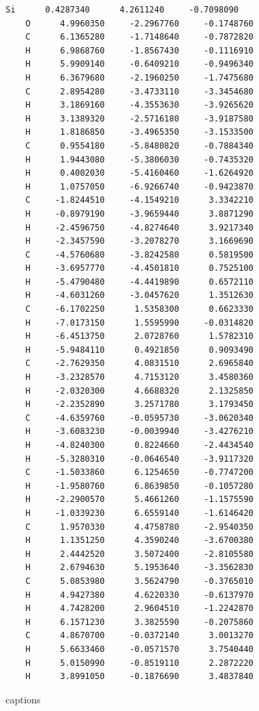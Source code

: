 \documentclass[
  digital, %
  table,   %
  lof,     %
  lot,     %
  oneside,
]{fithesis3}
\begin{document}
\begin{lstlisting}[frame=single, caption={puvodni struktura puvodni methyl },label=DescriptiveLabel]
   Si      0.4287340      4.2611240     -0.7098090
    O      4.9960350     -2.2967760     -0.1748760
    C      6.1365280     -1.7148640     -0.7872820
    H      6.9868760     -1.8567430     -0.1116910
    H      5.9909140     -0.6409210     -0.9496340
    H      6.3679680     -2.1960250     -1.7475680
    C      2.8954280     -3.4733110     -3.3454680
    H      3.1869160     -4.3553630     -3.9265620
    H      3.1389320     -2.5716180     -3.9187580
    H      1.8186850     -3.4965350     -3.1533500
    C      0.9554180     -5.8480820     -0.7884340
    H      1.9443080     -5.3806030     -0.7435320
    H      0.4002030     -5.4160460     -1.6264920
    H      1.0757050     -6.9266740     -0.9423870
    C     -1.8244510     -4.1549210      3.3342210
    H     -0.8979190     -3.9659440      3.8871290
    H     -2.4596750     -4.8274640      3.9217340
    H     -2.3457590     -3.2078270      3.1669690
    C     -4.5760680     -3.8242580      0.5819500
    H     -3.6957770     -4.4501810      0.7525100
    H     -5.4790480     -4.4419890      0.6572110
    H     -4.6031260     -3.0457620      1.3512630
    C     -6.1702250      1.5358300      0.6623330
    H     -7.0173150      1.5595990     -0.0314820
    H     -6.4513750      2.0728760      1.5782310
    H     -5.9484110      0.4921850      0.9093490
    C     -2.7629350      4.0831510      2.6965840
    H     -3.2328570      4.7153120      3.4580360
    H     -2.0320300      4.6688320      2.1325850
    H     -2.2352890      3.2571780      3.1793450
    C     -4.6359760     -0.0595730     -3.0620340
    H     -3.6083230     -0.0039940     -3.4276210
    H     -4.8240300      0.8224660     -2.4434540
    H     -5.3280310     -0.0646540     -3.9117320
    C     -1.5033860      6.1254650     -0.7747200
    H     -1.9580760      6.8639850     -0.1057280
    H     -2.2900570      5.4661260     -1.1575590
    H     -1.0339230      6.6559140     -1.6146420
    C      1.9570330      4.4758780     -2.9540350
    H      1.1351250      4.3590240     -3.6700380
    H      2.4442520      3.5072400     -2.8105580
    H      2.6794630      5.1953640     -3.3562830
    C      5.0853980      3.5624790     -0.3765010
    H      4.9427380      4.6220330     -0.6137970
    H      4.7428200      2.9604510     -1.2242870
    H      6.1571230      3.3825590     -0.2075860
    C      4.8670700     -0.0372140      3.0013270
    H      5.6633460     -0.0571570      3.7540440
    H      5.0150990     -0.8519110      2.2872220
    H      3.8991050     -0.1876690      3.4837840

  \end{lstlisting}

{\csname captions\languagename\endcsname %
\makeatletter %
  \thesis@selectLocale{\thesis@locale}\makeatother
\printbibliography[heading=bibintoc]} %
\appendix %
\end{document}
